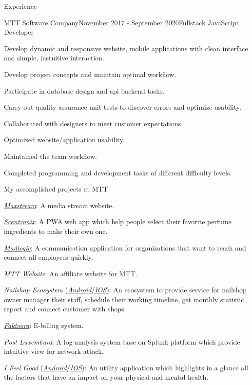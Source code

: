 \documentclass{resume}
\begin{document}
\begin{rSection}{Experience}
    \begin{rSubsection}{MTT Software Company}{November 2017 - September 2020}{Fullstack JavaScript Developer}{}
      \item Develop dynamic and responsive website, mobile applications with clean interface and simple, instuitive interaction.
      \item Develop project concepts and maintain optimal workflow.
      \item Participate in database design and api backend tasks.
      \item Carry out quality assurance unit tests to discover errors and optimize usability.
      \item Collaborated with designers to meet customer expectations.
      \item Optimized website/application usability.
      \item Maintained the team workflow.
      \item Completed programming and development tasks of different difficulty levels.
    \end{rSubsection}

    \begin{rSubsection}{}{}{My accomplished projects at MTT}{}
      \item \href{https://maxstream.tv/}{\emph{Maxstream}}: A media stream website.
      \item \href{https://app.scnt.me/}{\emph{Scentronix}}: A PWA web app which help people select their favorite perfume ingredients to make their own one.
      \item \href{https://www.madlogic.nl/magic/}{\emph{Madlogic}}: A communication application for organizations that want to reach and connect all employees quickly.
      \item \href{https://mttjsc.com/}{\emph{MTT Website}}: An affiliate website for MTT.
      \item \emph{Nailshop Ecosystem} (\href{https://play.google.com/store/apps/developer?id=MTT+Software+Company+LTD/}{\emph{Android}}/\href{https://apps.apple.com/us/developer/mttjsc/id1250334932}{\emph{IOS}}): 
      An ecosystem to provide service for nailshop owner manager their
      staff, schedule their working timeline, get monthly statistic report and connect customer with shops.
      \item \href{http://app.faktoora.com}{\emph{Faktoora}}: E-billing system.
      \item \emph{Post Luxemburd}: A log analysis system base on Splunk platform which provide intuitive view for network attack.
      \item \emph{I Feel Good} (\href{https://play.google.com/store/apps/details?id=com.ifg_mobile}{\emph{Android}}/\href{}{\emph{IOS}}): 
      An utility application which highlights in a glance all the factors that have an impact on your physical and mental health.
    \end{rSubsection}
  

\end{rSection}
\end{document}
